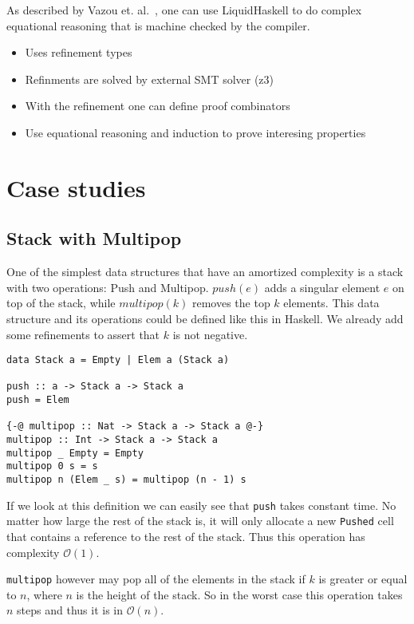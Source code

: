 \documentclass[sigplan,screen]{acmart}
\renewcommand\O[1]{$\mathcal{O}(#1)$}
\begin{document}
As described by Vazou et. al.~\cite{tpfa}, one can use LiquidHaskell to do complex equational reasoning that is machine checked by the compiler.

\begin{itemize}
\item{Uses refinement types}
\item{Refinments are solved by external SMT solver (z3)}
\item{With the refinement one can define proof combinators}
\item{Use equational reasoning and induction to prove interesing properties}
\end{itemize}

\section{Case studies}

\subsection{Stack with Multipop}

One of the simplest data structures that have an amortized complexity is a stack with two operations: Push and Multipop. $push(e)$ adds a singular element $e$ on top of the stack, while $multipop(k)$ removes the top $k$ elements. This data structure and its operations could be defined like this in Haskell. We already add some refinements to assert that $k$ is not negative.

\begin{lstlisting}
data Stack a = Empty | Elem a (Stack a)

push :: a -> Stack a -> Stack a
push = Elem

{-@ multipop :: Nat -> Stack a -> Stack a @-}
multipop :: Int -> Stack a -> Stack a
multipop _ Empty = Empty
multipop 0 s = s
multipop n (Elem _ s) = multipop (n - 1) s
\end{lstlisting}

If we look at this definition we can easily see that \texttt{push} takes constant time. No matter how large the rest of the stack is, it will only allocate a new \texttt{Pushed} cell that contains a reference to the rest of the stack. Thus this operation has complexity \O{1}.

\texttt{multipop} however may pop all of the elements in the stack if $k$ is greater or equal to $n$, where $n$ is the height of the stack. So in the worst case this operation takes $n$ steps and thus it is in \O{n}.
\end{document}
